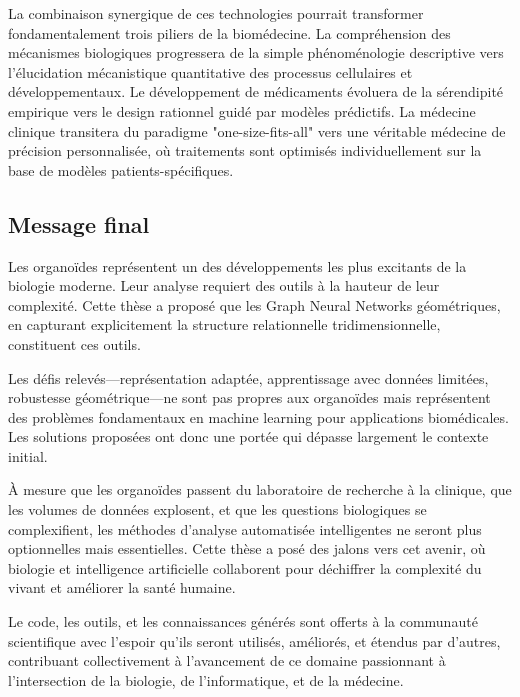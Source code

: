 La combinaison synergique de ces technologies pourrait transformer fondamentalement trois piliers de la biomédecine. La compréhension des mécanismes biologiques progressera de la simple phénoménologie descriptive vers l'élucidation mécanistique quantitative des processus cellulaires et développementaux. Le développement de médicaments évoluera de la sérendipité empirique vers le design rationnel guidé par modèles prédictifs. La médecine clinique transitera du paradigme "one-size-fits-all" vers une véritable médecine de précision personnalisée, où traitements sont optimisés individuellement sur la base de modèles patients-spécifiques.

\subsection{Message final}

Les organoïdes représentent un des développements les plus excitants de la biologie moderne. Leur analyse requiert des outils à la hauteur de leur complexité. Cette thèse a proposé que les Graph Neural Networks géométriques, en capturant explicitement la structure relationnelle tridimensionnelle, constituent ces outils.

Les défis relevés—représentation adaptée, apprentissage avec données limitées, robustesse géométrique—ne sont pas propres aux organoïdes mais représentent des problèmes fondamentaux en machine learning pour applications biomédicales. Les solutions proposées ont donc une portée qui dépasse largement le contexte initial.

À mesure que les organoïdes passent du laboratoire de recherche à la clinique, que les volumes de données explosent, et que les questions biologiques se complexifient, les méthodes d'analyse automatisée intelligentes ne seront plus optionnelles mais essentielles. Cette thèse a posé des jalons vers cet avenir, où biologie et intelligence artificielle collaborent pour déchiffrer la complexité du vivant et améliorer la santé humaine.

Le code, les outils, et les connaissances générés sont offerts à la communauté scientifique avec l'espoir qu'ils seront utilisés, améliorés, et étendus par d'autres, contribuant collectivement à l'avancement de ce domaine passionnant à l'intersection de la biologie, de l'informatique, et de la médecine.
